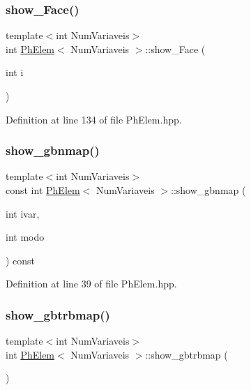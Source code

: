 \subsubsection{\texorpdfstring{show\+\_\+\+Face()}{show\_Face()}}
{\footnotesize\ttfamily template$<$int Num\+Variaveis$>$ \\
int \hyperlink{classPhElem}{Ph\+Elem}$<$ Num\+Variaveis $>$\+::show\+\_\+\+Face (\begin{DoxyParamCaption}\item[{int}]{i }\end{DoxyParamCaption})\hspace{0.3cm}{\ttfamily [inline]}}



Definition at line 134 of file Ph\+Elem.\+hpp.

\mbox{\label{classPhElem_a878851914f553298700437c5c8aef4dd}} 
\subsubsection{\texorpdfstring{show\+\_\+gbnmap()}{show\_gbnmap()}}
{\footnotesize\ttfamily template$<$int Num\+Variaveis$>$ \\
const int \hyperlink{classPhElem}{Ph\+Elem}$<$ Num\+Variaveis $>$\+::show\+\_\+gbnmap (\begin{DoxyParamCaption}\item[{int}]{ivar,  }\item[{int}]{modo }\end{DoxyParamCaption}) const\hspace{0.3cm}{\ttfamily [inline]}}



Definition at line 39 of file Ph\+Elem.\+hpp.

\mbox{\label{classPhElem_a2addc4d79151aeac865e2255be3b417d}} 
\subsubsection{\texorpdfstring{show\+\_\+gbtrbmap()}{show\_gbtrbmap()}}
{\footnotesize\ttfamily template$<$int Num\+Variaveis$>$ \\
int \hyperlink{classPhElem}{Ph\+Elem}$<$ Num\+Variaveis $>$\+::show\+\_\+gbtrbmap (\begin{DoxyParamCaption}{ }\end{DoxyParamCaption})\hspace{0.3cm}{\ttfamily [inline]}}



